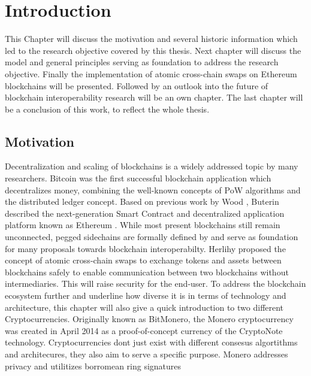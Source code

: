 %
%
\chapter{Introduction}
\label{ch:intro}
This Chapter will discuss the motivation and several historic information which led to the research objective covered by this thesis. Next chapter will discuss the model and general principles serving as foundation to address the research objective. Finally the implementation of atomic cross-chain swaps on Ethereum blockchains will be presented. Followed by an outlook into the future of blockchain interoperability research will be an own chapter.
The last chapter will be a conclusion of this work, to reflect the whole thesis.


%
%
\section{Motivation}
\label{sec:intro:motivation}
Decentralization and scaling of blockchains is a widely addressed topic by
many researchers. Bitcoin \cite{nakamoto2008peer} was the first successful blockchain application
which decentralizes money, combining the well-known concepts of \ac{PoW} algorithms and the distributed ledger concept. Based on previous work
by Wood \cite{wood2014ethereum}, Buterin described the next-generation Smart Contract and decentralized
application platform known as Ethereum \cite{buterin2013ethereum} \cite{buterin2014ethereum}. While most present
blockchains still remain unconnected, pegged sidechains are formally defined
by \cite{back2014enabling} and serve as foundation for many proposals towards blockchain
interoperabilty. Herlihy proposed the concept of atomic cross-chain
swaps to exchange tokens and assets between blockchains safely \cite{herlihy2018atomic}
to enable communication between two blockchains without intermediaries. This will raise security for the end-user.
To address the blockchain ecosystem further and underline how diverse it is in terms of technology and architecture, this chapter will also give a quick introduction to two different Cryptocurrencies.
Originally known as BitMonero, the Monero cryptocurrency was created in April 2014 \cite{alonso2020zero} as a proof-of-concept currency of the CryptoNote \cite{van2013cryptonote} technology.
Cryptocurrencies dont just exist with different consesus algortithms and architecures, they also aim to serve a specific purpose. Monero addresses privacy and utilitizes borromean ring signatures

